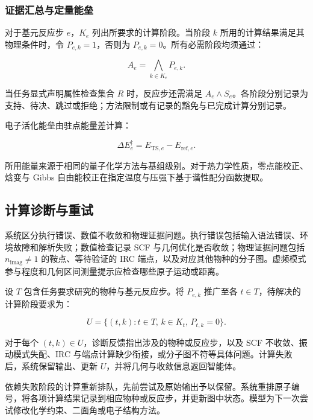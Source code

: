 \subsubsection{证据汇总与定量能垒}
对于基元反应步 $e$，$K_e$ 列出所要求的计算阶段。当阶段 $k$ 所用的计算结果满足其物理条件时，令 $P_{e,k}=1$，否则为 $P_{e,k}=0$。所有必需阶段均须通过：

\begin{equation}\label{eq:methods-13}
A_e=\bigwedge_{k\in K_e}P_{e,k}.
\end{equation}

当任务显式声明属性检查集合 $R$ 时，反应步还需满足 $A_e\wedge S_e$。各阶段分别记录为支持、待决、跳过或拒绝；方法限制或有记录的豁免与已完成计算分别记录。

电子活化能垒由驻点能量差计算：

\begin{equation}\label{eq:methods-14}
\Delta E_e^\ddagger=E_{\mathrm{TS},e}-E_{\mathrm{ref},e}.
\end{equation}

所用能量来源于相同的量子化学方法与基组级别。对于热力学性质，零点能校正、焓变与 Gibbs 自由能校正在指定温度与压强下基于谐性配分函数提取。

\subsection{计算诊断与重试}
系统区分执行错误、数值不收敛和物理证据问题。执行错误包括输入语法错误、环境故障和解析失败；数值检查记录 SCF 与几何优化是否收敛；物理证据问题包括 $n_{\mathrm{imag}}\ne 1$ 的鞍点、等待验证的 IRC 端点，以及对应其他物种的分子图。虚频模式参与程度和几何区间测量提示应检查哪些原子运动或距离。

设 $T$ 包含任务要求研究的物种与基元反应步。将 $P_{e,k}$ 推广至各 $t\in T$，待解决的计算阶段要求为：

\begin{equation}\label{eq:methods-15}
U=\{(t,k):t\in T,\, k\in K_t,\, P_{t,k}=0\}.
\end{equation}

对于每个 $(t,k)\in U$，诊断反馈指出涉及的物种或反应步，以及 SCF 不收敛、振动模式失配、IRC 与端点计算缺少衔接，或分子图不符等具体问题。计算失败后，系统保留输出、更新 $U$，并将几何与收敛信息返回智能体。

依赖失败阶段的计算重新排队，先前尝试及原始输出予以保留。系统重排原子编号，将各项计算结果记录到相应物种或反应步，并更新图中状态。模型为下一次尝试修改化学约束、二面角或电子结构方法。


